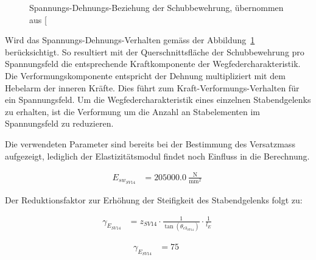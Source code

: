 \documentclass[
  11pt,
  letterpaper,
]{scrreprt}
\begin{document}
\begin{figure}[H]


\caption{\label{fig-sigma-epsilon-sv14}Spannungs-Dehnungs-Beziehung der
Schubbewehrung, übernommen aus
{[}\citeproc{ref-gitz_ansatze_2024}{1}{]}}

\end{figure}%

Wird das Spannungs-Dehnungs-Verhalten gemäss der
Abbildung~\ref{fig-sigma-epsilon-sv14} berücksichtigt. So resultiert mit
der Querschnittsfläche der Schubbewehrung pro Spannungsfeld die
entsprechende Kraftkomponente der Wegfedercharakteristik. Die
Verformungskomponente entspricht der Dehnung multipliziert mit dem
Hebelarm der inneren Kräfte. Dies führt zum Kraft-Verformungs-Verhalten
für ein Spannungsfeld. Um die Wegfedercharakteristik eines einzelnen
Stabendgelenks zu erhalten, ist die Verformung um die Anzahl an
Stabelementen im Spannungsfeld zu reduzieren.

Die verwendeten Parameter sind bereits bei der Bestimmung des
Versatzmass aufgezeigt, lediglich der Elastizitätsmodul findet noch
Einfluss in die Berechnung.

$$
\begin{aligned}
E_{sw_{SV14}} &= 205000.0\ \frac{\mathrm{N}}{\mathrm{mm}^{2}} \;
\end{aligned}
$$

Der Reduktionsfaktor zur Erhöhung der Steifigkeit des Stabendgelenks
folgt zu:

$$
\begin{aligned}
\gamma_{E_{SV14}} &= z_{SV14} \cdot \frac{ 1 }{ \tan \left( \theta_{c3_{SV14}} \right) } \cdot \frac{1} { l_{E} } \; 
\end{aligned}
$$

$$
\begin{aligned}
\gamma_{E_{SV14}} &= 75\ \;
\end{aligned}
$$
\end{document}
